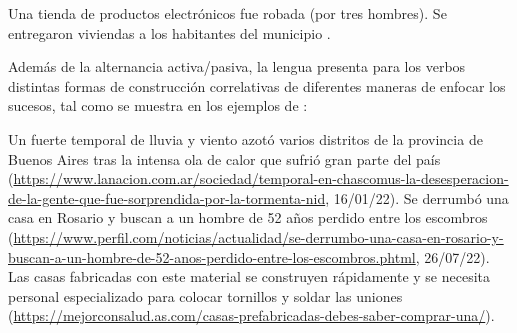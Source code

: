 \begin{exe}
  \ex\label{ex:01-pasivas}
    \begin{xlist}
      \ex\label{ex:01-pasivas-a} Una tienda de productos electrónicos fue robada (por tres hombres).
      \ex\label{ex:01-pasivas-b} Se entregaron viviendas a los habitantes del municipio
          .
    \end{xlist}
\end{exe}

Además de la alternancia activa/pasiva, la lengua presenta para los verbos
distintas formas de construcción correlativas de diferentes maneras de enfocar
los sucesos, tal como se muestra en los ejemplos de :

\begin{exe}
  \ex\label{ex:01-perspectiva}
    \begin{xlist}
      \ex\label{ex:01-perspectiva-a} Un fuerte temporal de lluvia y viento azotó varios distritos de
          la provincia de Buenos Aires tras la intensa ola de calor que sufrió
          gran parte del país
          (\url{https://www.lanacion.com.ar/sociedad/temporal-en-chascomus-la-desesperacion-de-la-gente-que-fue-sorprendida-por-la-tormenta-nid},
          16/01/22).
      \ex\label{ex:01-perspectiva-b} Se derrumbó una casa en Rosario y buscan a un hombre de 52 años
          perdido entre los escombros
          (\url{https://www.perfil.com/noticias/actualidad/se-derrumbo-una-casa-en-rosario-y-buscan-a-un-hombre-de-52-anos-perdido-entre-los-escombros.phtml},
          26/07/22).
      \ex\label{ex:01-perspectiva-c} Las casas fabricadas con este material se construyen
          rápidamente y se necesita personal especializado para colocar
          tornillos y soldar las uniones
          (\url{https://mejorconsalud.as.com/casas-prefabricadas-debes-saber-comprar-una/}).
    \end{xlist}
\end{exe}

